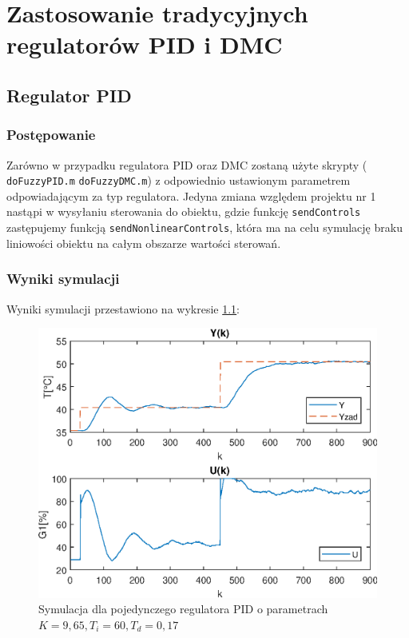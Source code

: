 \chapter{Zastosowanie tradycyjnych regulatorów PID i DMC}




\section{Regulator PID}

\subsection{Postępowanie}

Zarówno w przypadku regulatora PID oraz DMC zostaną użyte skrypty  ( \verb|doFuzzyPID.m|  \verb|doFuzzyDMC.m|) z odpowiednio ustawionym parametrem odpowiadającym za typ regulatora. Jedyna zmiana względem projektu nr 1 nastąpi w wysyłaniu sterowania do obiektu, gdzie funkcję \verb|sendControls| zastępujemy funkcją \verb|sendNonlinearControls|, która ma na celu symulację braku liniowości obiektu na całym obszarze wartości sterowań. 

\subsection{Wyniki symulacji}

Wyniki symulacji przestawiono na wykresie \ref{naiwnyPID}:

\begin{figure}[h!]
	\centering
	\includegraphics[scale=1]{Rys/NaiwnyPID.eps}
	\caption{Symulacja dla pojedynczego regulatora PID o parametrach $K=9,65, T_{i}=60,  T_{d}=0,17 $}
	\label{naiwnyPID}
\end{figure}


